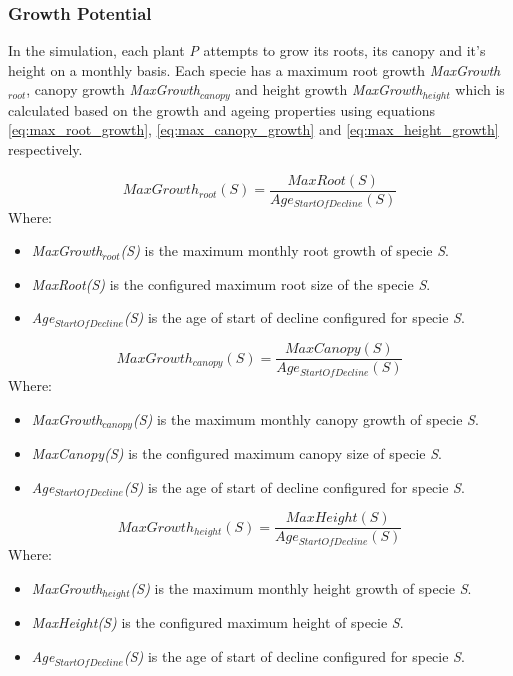 \subsubsection{Growth Potential}

In the simulation, each plant \textit{P} attempts to grow its roots, its canopy and it's height on a monthly basis. Each specie has a maximum root growth \textit{MaxGrowth$_{root}$}, canopy growth \textit{MaxGrowth$_{canopy}$} and height growth \textit{MaxGrowth$_{height}$} which is calculated based on the growth and ageing properties using equations \ref{eq:max_root_growth}, \ref{eq:max_canopy_growth} and \ref{eq:max_height_growth} respectively.

\begin{equation}
MaxGrowth_{root}(S) = \frac{MaxRoot(S)}{Age_{StartOfDecline}(S)}
\label{eq:max_root_growth}
\end{equation}
Where:
\begin{itemize}
\item \textit{MaxGrowth$_{root}$(S)} is the maximum monthly root growth of specie \textit{S}.
\item \textit{MaxRoot(S)} is the configured maximum root size of the specie \textit{S}.
\item \textit{Age$_{StartOfDecline}$(S)} is the age of start of decline configured for specie \textit{S}.
\end{itemize}

\begin{equation}
MaxGrowth_{canopy}(S) = \frac{MaxCanopy(S)}{Age_{StartOfDecline}(S)}
\label{eq:max_canopy_growth}
\end{equation}
Where:
\begin{itemize}
\item \textit{MaxGrowth$_{canopy}$(S)} is the maximum monthly canopy growth of specie \textit{S}.
\item \textit{MaxCanopy(S)} is the configured maximum canopy size of specie \textit{S}.
\item \textit{Age$_{StartOfDecline}$(S)} is the age of start of decline configured for specie \textit{S}.
\end{itemize}

\begin{equation}
MaxGrowth_{height}(S) = \frac{MaxHeight(S)}{Age_{StartOfDecline}(S)}
\label{eq:max_height_growth}
\end{equation}
Where:
\begin{itemize}
\item \textit{MaxGrowth$_{height}$(S)} is the maximum monthly height growth of specie \textit{S}.
\item \textit{MaxHeight(S)} is the configured maximum height of specie \textit{S}.
\item \textit{Age$_{StartOfDecline}$(S)} is the age of start of decline configured for specie \textit{S}.
\end{itemize}

